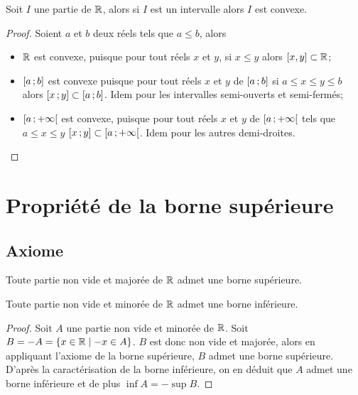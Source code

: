 \begin{theo}
  \label{theo:partieconvexe1}
  Soit \(I\) une partie de \(\mathbb{R}\), alors si \(I\) est un intervalle alors \(I\) est convexe.
\end{theo}
\begin{proof}
  Soient \(a\) et \(b\) deux réels tels que \(a\leqslant b\), alors
  \begin{itemize}
  \item \(\mathbb{R}\) est convexe, puisque pour tout réels \(x\) et \(y\), si \(x\leqslant y\) alors \([x,y]\subset \mathbb{R}\);
  \item \(\left[ a \, ;  b \right]\) est convexe puisque pour tout réels \(x\) et \(y\) de \(\left[ a \, ;  b \right]\) si \(a\leqslant x\leqslant y\leqslant b\) alors \(\left[ x \, ;  y \right]\subset \left[ a \, ;  b \right]\). Idem pour les intervalles semi-ouverts et semi-fermés;
  \item \(\left[ a \, ;  +\infty \right[\) est convexe, puisque pour tout réels \(x\) et \(y\) de \(\left[ a \, ;  +\infty \right[\) tels que \(a\leqslant x\leqslant y\) \(\left[ x \, ;  y \right]\subset \left[ a \, ;  +\infty \right[\). Idem pour les autres demi-droites.
  \end{itemize}
\end{proof}

\section{Propriété de la borne supérieure}

\subsection{Axiome}

\begin{theo}
  \label{theo:bornesup}
  Toute partie non vide et majorée de \(\mathbb{R}\) admet une borne supérieure.
\end{theo}
\begin{theo}
  Toute partie non vide et minorée de \(\mathbb{R}\) admet une borne inférieure.
\end{theo}
\begin{proof}
  Soit \(A\) une partie non vide et minorée de \(\mathbb{R}\). Soit \(B=-A=\left\{x\in \mathbb{R}\mathrel{}\middle|\mathrel{}-x \in A\right\}\). \(B\) est donc non vide et majorée, alors en appliquant l'axiome de la borne supérieure, \(B\) admet une borne supérieure. D'après la caractérisation de la borne inférieure, on en déduit que \(A\) admet une borne inférieure et de plus \(\inf A=-\sup B\).
\end{proof}

